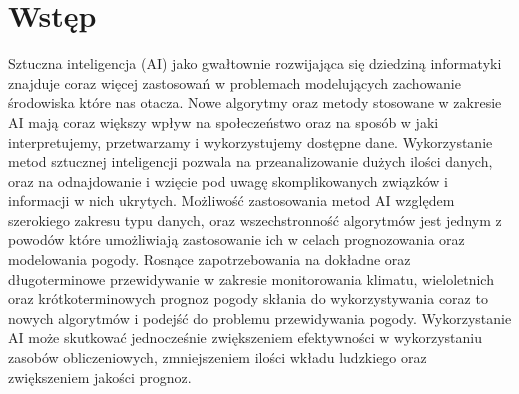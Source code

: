 



\section{Wstęp}

Sztuczna inteligencja (AI) jako gwałtownie rozwijająca się 
dziedziną informatyki znajduje coraz więcej zastosowań w 
problemach modelujących zachowanie środowiska które nas otacza. 
Nowe algorytmy oraz metody stosowane w zakresie AI mają coraz
większy wpływ na społeczeństwo oraz na sposób w jaki interpretujemy,
przetwarzamy i wykorzystujemy dostępne dane. Wykorzystanie metod
sztucznej inteligencji pozwala na przeanalizowanie dużych ilości
danych, oraz na odnajdowanie i wzięcie pod uwagę skomplikowanych związków
i informacji w nich ukrytych. Możliwość zastosowania metod AI względem 
szerokiego zakresu typu danych, oraz wszechstronność algorytmów jest jednym z 
powodów które umożliwiają zastosowanie ich w celach prognozowania oraz modelowania
pogody. Rosnące zapotrzebowania na dokładne oraz długoterminowe przewidywanie
w zakresie monitorowania klimatu, wieloletnich oraz krótkoterminowych prognoz
pogody skłania do wykorzystywania coraz to nowych algorytmów i podejść
do problemu przewidywania pogody. Wykorzystanie AI może skutkować jednocześnie 
zwiększeniem efektywności w wykorzystaniu zasobów obliczeniowych, zmniejszeniem
ilości wkładu ludzkiego oraz zwiększeniem jakości prognoz.

